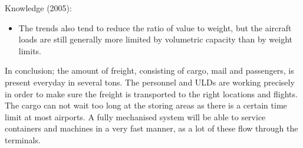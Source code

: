 Knowledge (2005):
\begin{itemize}
\item The trends also tend to reduce the ratio of value to weight, but the aircraft loads are still generally more limited by volumetric capacity than by weight limits.
\end{itemize}

In conclusion; the amount of freight, consisting of cargo, mail and passengers, is present everyday in several tons. The personnel and ULDs are working precisely  in order to make sure the freight is transported to the right locations and flights. The cargo can not wait too long at the storing areas as there is a certain time limit at  most airports. A fully mechanised system will be able to service containers and machines in a very fast manner, as a lot of these flow through the terminals.
